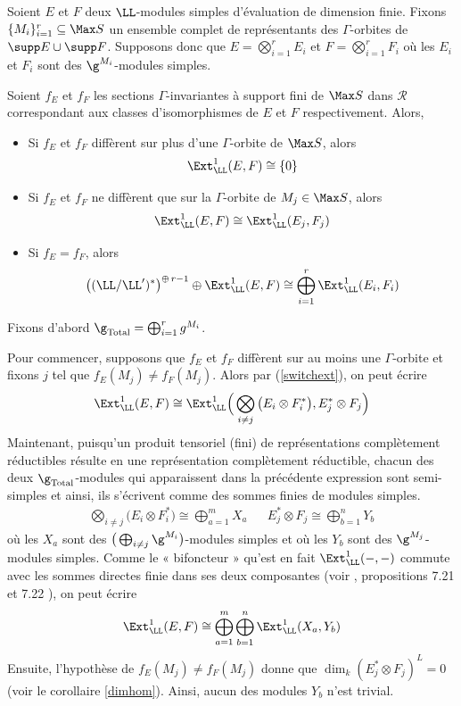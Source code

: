 \begin{Thm} \label{exteval} Soient $E$ et $F$ deux $\LL$-modules simples d'évaluation de dimension finie. Fixons $\{M_i\}_{i=1}^r \subseteq \Max S$ un ensemble complet de représentants des $\Gamma$-orbites de \linebreak $\supp E \cup \supp F$. Supposons donc que $E = \bigotimes_{i=1}^r E_i$ et  $F = \bigotimes_{i=1}^r F_i$ où les $E_i$ et $F_i$ sont des $\g^{M_i}$-modules simples. 

Soient $f_E$ et $f_F$ les sections $\Gamma$-invariantes à support fini de $\Max S$ dans $\mathcal{R}$ correspondant aux classes d'isomorphismes de $E$ et $F$ respectivement. Alors,

\begin{itemize}
\item[(1)] Si $f_E$ et $f_F$ diff\`erent sur plus d'une $\Gamma$-orbite de $\Max S$, alors 
$$ \Ext_\LL^1(E,F) \cong \{0\} $$
\item[(2)] Si $f_E$ et $f_F$ ne diff\`erent que sur la $\Gamma$-orbite de $M_j \in \Max S$, alors 
$$ \Ext_\LL^1(E,F) \cong \Ext_\LL^1(E_j,F_j) $$
\item[(3)] Si $f_E = f_F$, alors 
$$ \big((\LL/\LL')^*\big)^{\oplus\,r-1} \oplus \Ext_\LL^1(E,F) \cong \bigoplus_{i=1}^r \Ext_\LL^1(E_i,F_i) $$
\end{itemize}
\begin{pre} Fixons d'abord $\g_\text{Total} = \bigoplus_{i=1}^r g^{M_i}$. 

Pour commencer, supposons que $f_E$ et $f_F$ diffèrent sur au moins une $\Gamma$-orbite et fixons $j$ tel que $f_E(M_j) \neq f_F(M_j)$. Alors par (\ref{switchext}), on peut écrire
$$ \Ext_\LL^1(E,F) \cong \Ext_\LL^1\Big(\bigotimes_{i \neq j} \big(E_i \otimes F_i^*\big),E_j^* \otimes F_j\Big) $$
Maintenant, puisqu'un produit tensoriel (fini) de représentations complètement réductibles résulte en une représentation complètement réductible, chacun des deux $\g_\text{Total}$-modules qui apparaissent dans la précédente expression sont semi-simples et ainsi, ils s'écrivent comme des sommes finies de modules simples. 
\begin{align*}
\bigotimes_{i \neq j} \big(E_i \otimes F_i^*) \cong \bigoplus_{a=1}^m X_a && E_j^* \otimes F_j \cong \bigoplus_{b=1}^n Y_b
\end{align*}
où les $X_a$ sont des $\big(\bigoplus_{i \neq j} \g^{M_i}\big)$-modules simples et où les $Y_b$ sont des $\g^{M_j}$-modules simples. Comme le « bifoncteur » qu'est en fait $\Ext_\LL^1(-,-)$ commute avec les sommes directes finie dans ses deux composantes (voir \cite{Rotman}, propositions 7.21 et 7.22 ), on peut écrire
\begin{equation} \label{extdiffere}
\Ext_\LL^1(E,F) \cong \bigoplus_{a=1}^m\bigoplus_{b=1}^n\Ext_\LL^1(X_a,Y_b)
\end{equation}
Ensuite, l'hypothèse de $f_E(M_j) \neq f_F(M_j)$ donne que $\dim_k(E_j^* \otimes F_j)^L = 0$ (voir le corollaire \ref{dimhom}). Ainsi, aucun des modules $Y_b$ n'est trivial.


\end{pre}
\end{Thm}
